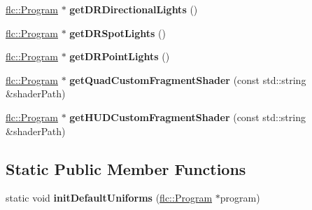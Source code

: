 \begin{DoxyCompactItemize}
\item 
\hyperlink{classflw_1_1flc_1_1Program}{flc\+::\+Program} $\ast$ {\bfseries get\+D\+R\+Directional\+Lights} ()\hypertarget{classflw_1_1flf_1_1ProgramLoader_a01b6bedebb1e818e6f0dc53e181acf62}{}\label{classflw_1_1flf_1_1ProgramLoader_a01b6bedebb1e818e6f0dc53e181acf62}

\item 
\hyperlink{classflw_1_1flc_1_1Program}{flc\+::\+Program} $\ast$ {\bfseries get\+D\+R\+Spot\+Lights} ()\hypertarget{classflw_1_1flf_1_1ProgramLoader_a9bfb396c833f10230f42a295393489eb}{}\label{classflw_1_1flf_1_1ProgramLoader_a9bfb396c833f10230f42a295393489eb}

\item 
\hyperlink{classflw_1_1flc_1_1Program}{flc\+::\+Program} $\ast$ {\bfseries get\+D\+R\+Point\+Lights} ()\hypertarget{classflw_1_1flf_1_1ProgramLoader_ab291188d4d289abf691808e6b4f552da}{}\label{classflw_1_1flf_1_1ProgramLoader_ab291188d4d289abf691808e6b4f552da}

\item 
\hyperlink{classflw_1_1flc_1_1Program}{flc\+::\+Program} $\ast$ {\bfseries get\+Quad\+Custom\+Fragment\+Shader} (const std\+::string \&shader\+Path)\hypertarget{classflw_1_1flf_1_1ProgramLoader_a46dd25f6746abd4b7287b9baed280334}{}\label{classflw_1_1flf_1_1ProgramLoader_a46dd25f6746abd4b7287b9baed280334}

\item 
\hyperlink{classflw_1_1flc_1_1Program}{flc\+::\+Program} $\ast$ {\bfseries get\+H\+U\+D\+Custom\+Fragment\+Shader} (const std\+::string \&shader\+Path)\hypertarget{classflw_1_1flf_1_1ProgramLoader_ae8ba0d5317ab228b612f6a33395a0c56}{}\label{classflw_1_1flf_1_1ProgramLoader_ae8ba0d5317ab228b612f6a33395a0c56}

\end{DoxyCompactItemize}
\subsection*{Static Public Member Functions}
\begin{DoxyCompactItemize}
\item 
static void {\bfseries init\+Default\+Uniforms} (\hyperlink{classflw_1_1flc_1_1Program}{flc\+::\+Program} $\ast$program)\hypertarget{classflw_1_1flf_1_1ProgramLoader_ae5e0e6fec3dd58815642980692b0e2ce}{}\label{classflw_1_1flf_1_1ProgramLoader_ae5e0e6fec3dd58815642980692b0e2ce}

\end{DoxyCompactItemize}
